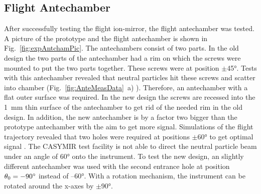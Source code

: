	\subsection{Flight Antechamber} \label{subsec:ExpAnteCham}
	After successfully testing the flight ion-mirror, the flight antechamber was tested. A picture of the prototype and the flight antechamber is shown in Fig.~\ref{fig:expAntchamPic}. The antechambers consist of two parts. In the old design the two parts of the antechamber had a rim on which the screws were mounted to put the two parts together. These screws were at position $\pm$45°. Tests with this antechamber revealed that neutral particles hit these screws and scatter into chamber (Fig.~\ref{fig:AnteMeasData}~a) \cite{Meyer_2017_ante}). Therefore, an antechamber with a flat outer surface was required. In the new design the screws are recessed into the 1~mm thin surface of the antechamber to get rid of the needed rim in the old design. In addition, the new antechamber is by a factor two bigger than the prototype antechamber with the aim to get more signal. Simulations of the flight trajectory revealed that two holes were required at positions $\pm$60° to get optimal signal \cite{SOC_Crema3p2}. The CASYMIR test facility is not able to direct the neutral particle beam under an angle of 60° onto the instrument. To test the new design, an slightly different antechamber was used with the second entrance hole at position $\theta_0 = -90^\circ$ instead of --60°. With a rotation mechanism, the instrument can be rotated around the x-axes by $\pm$90°.\\
